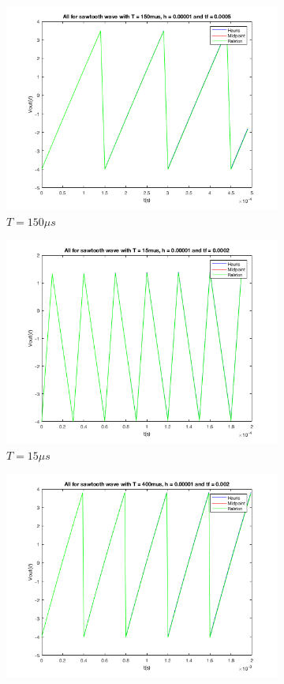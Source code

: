 \documentclass[11pt,a4paper]{article}
\begin{document}
    \begin{figure}[h]
        \begin{subfigure}{.5\textwidth}
          \centering
          \includegraphics[width=.8\linewidth]{Ex1_Figs/sawtooth150.png}
          \caption{$T = 150\mu s$}
          \label{fig:sfig9}
        \end{subfigure}%
        \begin{subfigure}{.5\textwidth}
          \centering
          \includegraphics[width=.8\linewidth]{Ex1_Figs/sawtooth15.png}
          \caption{$T = 15\mu s$}
          \label{fig:sfig10}
        \end{subfigure}
        \begin{subfigure}{.5\textwidth}
          \centering
          \includegraphics[width=.8\linewidth]{Ex1_Figs/sawtooth400.png}

\end{subfigure}
\end{figure}
\end{document}
